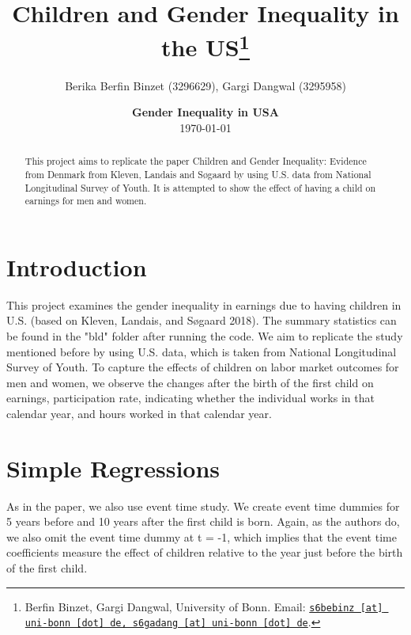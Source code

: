 \documentclass[11pt, a4paper, leqno]{article}
\begin{document}
\title{Children and Gender Inequality in the US\thanks{Berfin Binzet, Gargi Dangwal, University of Bonn. Email: \href{mailto:s6bebinz@uni-bonn.de, s6gadang@uni-bonn.de}{\nolinkurl{s6bebinz [at] uni-bonn [dot] de, s6gadang [at] uni-bonn [dot] de}}.}}

\author{Berika Berfin Binzet (3296629), Gargi Dangwal (3295958) }

\date{
    {\bf Gender Inequality in USA}
    \\[1ex]
    \today
}

\maketitle

\begin{abstract}
 This project aims to replicate the paper Children and Gender Inequality: Evidence from Denmark from Kleven, Landais and Søgaard by using U.S. data from National Longitudinal Survey of Youth. It is attempted to show the effect of having a child on earnings for men and women. 
\end{abstract}
\clearpage

\section*{Introduction} 
This project examines the gender inequality in earnings due to having children in U.S. (based on Kleven, Landais, and Søgaard 2018). The summary statistics can be found in the "bld" folder after running the code. We aim to replicate the study mentioned before by using U.S. data, which is taken from National Longitudinal Survey of Youth. To capture the effects of children on labor market outcomes for men and women, we observe the changes after the birth of the first child on earnings, participation rate, indicating whether the individual works in that calendar year, and hours worked in that calendar year. 

\section*{Simple Regressions}
As in the paper, we also use event time study. We create event time dummies for 5 years before and 10 years after the first child is born. Again, as the authors do, we also omit the event time dummy at t = -1, which implies that the event time coefficients measure the effect of children relative to the year just before the birth of the first child. 
\end{document}
